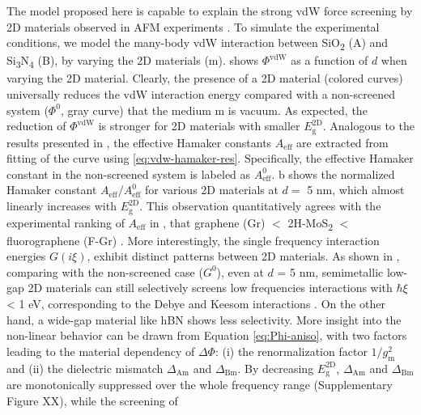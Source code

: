 The model proposed here is capable to explain the
strong vdW force screening by 2D materials observed in AFM experiments
\cite{Tsoi_2014}.
%
To simulate the experimental conditions, we model the
many-body vdW interaction between SiO\textsubscript{2} (A) and Si\textsubscript{3}N\textsubscript{4} (B), by
varying the 2D materials (m).
 shows \(\Phi^{\mathrm{vdW}}\) as a function of
\(d\) when varying the 2D material.
%
Clearly, the presence of a 2D material (colored curves) universally
reduces the vdW interaction energy compared with a non-screened system
(\(\Phi^{0}\), gray curve) that the medium m is vacuum.
%
As expected, the reduction of $\Phi^{\mathrm{vdW}}$ is stronger for 2D
materials with smaller \(E_{\mathrm{g}}^{\mathrm{2D}}\).
%
Analogous to the results presented in
\cite{Tsoi_2014_vdW_screening_2D}, the effective Hamaker constants
\(A_{\mathrm{eff}}\) are extracted from fitting of the curve using
\autoref{eq:vdw-hamaker-res}. 
%
Specifically, the effective Hamaker constant in the non-screened system is labeled as $A_{\mathrm{eff}}^{0}$.
%
b shows the normalized Hamaker constant
$A_{\mathrm{eff}} / A_{\mathrm{eff}}^{0}$ for various 2D materials at
$d=$ 5 nm, which almost linearly increases
with \(E_{\mathrm{g}}^{\mathrm{2D}}\).
%
This
observation quantitatively agrees with the experimental ranking of
\(A_{\mathrm{eff}}\) in \cite{Tsoi_2014}, that graphene (Gr) $<$ 2H-MoS\textsubscript{2} $<$ fluoro\-graphene (F-Gr) \cite{Tsoi_2014}.
%
More interestingly, the single frequency interaction energies
\(G(i\xi)\), exhibit distinct patterns between 2D materials. As shown
in , comparing with the non-screened case
($G^{0}$), even at \(d\) = 5 nm, semi\-metallic low-gap 2D materials
can still selectively screens low frequencies interactions with
\(\hbar\xi\) \textless{} 1 eV, corresponding to the Debye and Keesom
interactions \cite{israelachvili_intermolecular_2011}.
%
On the other hand, a wide-gap material like hBN shows less selectivity.
%
More insight into the non-linear
behavior can be drawn from Equation \ref{eq:Phi-aniso}, with two
factors leading to the material dependency of \(\Delta \Phi\): (i) the
renormalization factor \(1/g_{\mathrm{m}}^{2}\) and (ii) the
dielectric mismatch \(\Delta_{\mathrm{Am}}\) and
\(\Delta_{\mathrm{Bm}}\). By decreasing
\(E_{\mathrm{g}}^{\mathrm{2D}}\), \(\Delta_{\mathrm{Am}}\) and
\(\Delta_{\mathrm{Bm}}\) are monotonically suppressed over the whole
frequency range (Supplementary Figure XX), while the screening of
